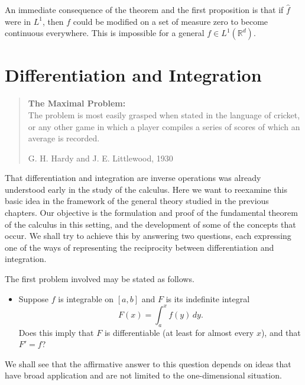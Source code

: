 \documentclass[11pt,openany]{book}
\begin{document}
An immediate consequence of the theorem and the first proposition is that if $\widehat f$ were in $L^1$, then $f$ could be modified on a set of measure zero to become continuous everywhere. This is impossible for a general $f\in L^1(\mathbb{R}^d)$.


%

\chapter{Differentiation and Integration}

\begin{quote}
\textbf{The Maximal Problem:}\\
The problem is most easily grasped when stated in the language of cricket, or any other game in which a player compiles a series of scores of which an average is recorded.

\hfill G. H. Hardy and J. E. Littlewood, 1930
\end{quote}

That differentiation and integration are inverse operations was already understood early in the study of the calculus. Here we want to reexamine this basic idea in the framework of the general theory studied in the previous chapters. Our objective is the formulation and proof of the fundamental theorem of the calculus in this setting, and the development of some of the concepts that occur. We shall try to achieve this by answering two questions, each expressing one of the ways of representing the reciprocity between differentiation and integration.

The first problem involved may be stated as follows.
\begin{itemize}
\item Suppose $f$ is integrable on $[a,b]$ and $F$ is its indefinite integral
\[
F(x)=\int_a^x f(y)\,dy.
\]
Does this imply that $F$ is differentiable (at least for almost every $x$), and that $F'=f$?
\end{itemize}
We shall see that the affirmative answer to this question depends on ideas that have broad application and are not limited to the one-dimensional situation.
\end{document}
